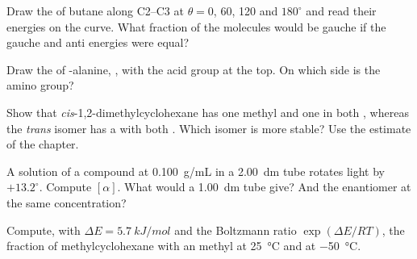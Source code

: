 \begin{exercise}[$\star\star$]\label{exo:b1:stereochemistry-in-depth:5}
Draw the  of butane along C2--C3 at $\theta = 0$, 60,
120 and $180^\circ$ and read their energies on the curve. What fraction of
the molecules would be gauche if the gauche and anti energies were equal?
\end{exercise}

\begin{exercise}[$\star\star$]\label{exo:b1:stereochemistry-in-depth:6}
Draw the  of -alanine,
, with the acid group at the top. On which side is
the amino group?
\end{exercise}

\begin{exercise}[$\star\star$]\label{exo:b1:stereochemistry-in-depth:7}
Show that \textit{cis}-1,2-dimethylcyclohexane has one methyl  and
one  in both , whereas the \textit{trans} isomer has a
 with both . Which isomer is more stable? Use the
estimate of the chapter.
\end{exercise}

\begin{exercise}[$\star\star$]\label{exo:b1:stereochemistry-in-depth:8}
A solution of a  compound at \qty{0.100}{g/mL} in a \qty{2.00}{dm}
tube rotates light by $+13.2^\circ$. Compute $[\alpha]$. What would a
\qty{1.00}{dm} tube give? And the enantiomer at the same concentration?
\end{exercise}

\begin{exercise}[$\star\star$]\label{exo:b1:stereochemistry-in-depth:9}
Compute, with $\Delta E = \qty{5.7}{kJ/mol}$ and the Boltzmann ratio
$\exp(\Delta E/RT)$, the fraction of methylcyclohexane  with an
 methyl at \qty{25}{\celsius} and at \qty{-50}{\celsius}.
\end{exercise}

